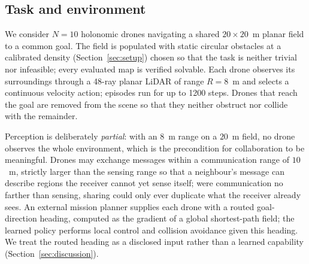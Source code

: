 
\subsection{Task and environment}\label{sec:methods-env}
We consider $N=10$ holonomic drones navigating a shared $20\times20$~m
planar field to a common goal. The field is populated with static circular
obstacles at a calibrated density (Section~\ref{sec:setup}) chosen so that
the task is neither trivial nor infeasible; every evaluated map is verified
solvable. Each drone observes its surroundings through a 48-ray planar
LiDAR of range $R=8$~m and selects a continuous velocity action; episodes
run for up to 1200 steps. Drones that reach the goal are removed from the
scene so that they neither obstruct nor collide with the remainder.

Perception is deliberately \emph{partial}: with an $8$~m range on a $20$~m
field, no drone observes the whole environment, which is the precondition
for collaboration to be meaningful. Drones may exchange messages within a
communication range of $10$~m, strictly larger than the sensing range so
that a neighbour's message can describe regions the receiver cannot yet
sense itself; were communication no farther than sensing, sharing could
only ever duplicate what the receiver already sees. An external mission
planner supplies each drone with a routed goal-direction heading, computed
as the gradient of a global shortest-path field; the learned policy performs
local control and collision avoidance given this heading. We treat the
routed heading as a disclosed input rather than a learned capability
(Section~\ref{sec:discussion}).


